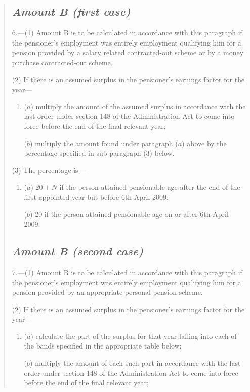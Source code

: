 \documentclass[12pt,a4paper]{article}
\begin{document}
\begin{quotation}
{}

\subsection*{\itshape Amount B (first case)}

6.---(1) Amount B is to be calculated in accordance with this paragraph if the pensioner’s employment was entirely employment qualifying him for a pension provided by a salary related contracted-out scheme or by a money purchase contracted-out scheme.

(2) If there is an assumed surplus in the pensioner’s earnings factor for the year—
\begin{enumerate}\item[]
($a$) multiply the amount of the assumed surplus in accordance with the last order under section 148 of the Administration Act to come into force before the end of the final relevant year;

($b$) multiply the amount found under paragraph ($a$)  above by the percentage specified in sub-paragraph (3)  below.
\end{enumerate}

(3) The percentage is—
\begin{enumerate}\item[]
($a$) $20 + N$ if the person attained pensionable age after the end of the first appointed year but before 6th April 2009;

($b$) 20 if the person attained pensionable age on or after 6th April 2009. 
\end{enumerate}

\subsection*{\itshape Amount B (second case)}

7.---(1) Amount B is to be calculated in accordance with this paragraph if the pensioner’s employment was entirely employment qualifying him for a pension provided by an appropriate personal pension scheme.

(2) If there is an assumed surplus in the pensioner’s earnings factor for the year—
\begin{enumerate}\item[]
($a$) calculate the part of the surplus for that year falling into each of the bands specified in the appropriate table below;

($b$) multiply the amount of each such part in accordance with the last order under section 148 of the Administration Act to come into force before the end of the final relevant year;


\end{enumerate}
\end{quotation}
\end{document}
